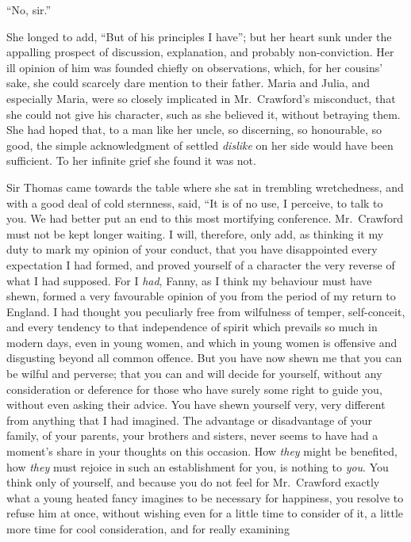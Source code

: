 ``No, sir.''

She longed to add, ``But of his principles I have''; but her
heart sunk under the appalling prospect of discussion,
explanation, and probably non-conviction. Her ill opinion
of him was founded chiefly on observations, which,
for her cousins' sake, she could scarcely dare mention
to their father.  Maria and Julia, and especially Maria,
were so closely implicated in Mr.\ Crawford's misconduct,
that she could not give his character, such as she
believed it, without betraying them.  She had hoped that,
to a man like her uncle, so discerning, so honourable,
so good, the simple acknowledgment of settled \emph{dislike}
on her side would have been sufficient.  To her infinite
grief she found it was not.

Sir Thomas came towards the table where she sat
in trembling wretchedness, and with a good deal of
cold sternness, said, ``It is of no use, I perceive,
to talk to you.  We had better put an end to this
most mortifying conference.  Mr.\ Crawford must not be
kept longer waiting.  I will, therefore, only add,
as thinking it my duty to mark my opinion of your conduct,
that you have disappointed every expectation I had formed,
and proved yourself of a character the very reverse
of what I had supposed.  For I \emph{had}, Fanny, as I think
my behaviour must have shewn, formed a very favourable
opinion of you from the period of my return to England.
I had thought you peculiarly free from wilfulness of temper,
self-conceit, and every tendency to that independence
of spirit which prevails so much in modern days,
even in young women, and which in young women is offensive
and disgusting beyond all common offence.  But you
have now shewn me that you can be wilful and perverse;
that you can and will decide for yourself, without any
consideration or deference for those who have surely some
right to guide you, without even asking their advice.
You have shewn yourself very, very different from anything
that I had imagined.  The advantage or disadvantage of
your family, of your parents, your brothers and sisters,
never seems to have had a moment's share in your thoughts
on this occasion.  How \emph{they} might be benefited,
how \emph{they} must rejoice in such an establishment for you,
is nothing to \emph{you}.  You think only of yourself,
and because you do not feel for Mr.\ Crawford exactly what a
young heated fancy imagines to be necessary for happiness,
you resolve to refuse him at once, without wishing
even for a little time to consider of it, a little more
time for cool consideration, and for really examining
